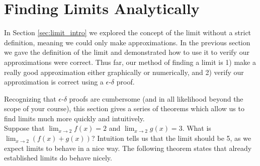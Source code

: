 \section{Finding Limits Analytically}\label{sec:limit_analytically}

%

In Section \ref{sec:limit_intro} we explored the concept of the limit without a strict definition, meaning we could only make approximations. In the previous section we gave the definition of the limit and demonstrated how to use it to verify our approximations were correct. Thus far, our method of finding a limit is 1) make a really good approximation either graphically or numerically, and 2) verify our approximation is correct using a $\epsilon$-$\delta$ proof.

Recognizing that $\epsilon$-$\delta$ proofs are cumbersome (and in all likelihood beyond the scope of your course), this section gives a series of theorems which allow us to find limits much more quickly and intuitively. \\

Suppose that $\lim_{x\to 2} f(x)=2$ and $\lim_{x\to 2} g(x) = 3$. What is $\lim_{x\to 2}(f(x)+g(x))$? Intuition tells us that the limit should be 5, as we expect limits to behave in a nice way. The following theorem states that already established limits do behave nicely.


